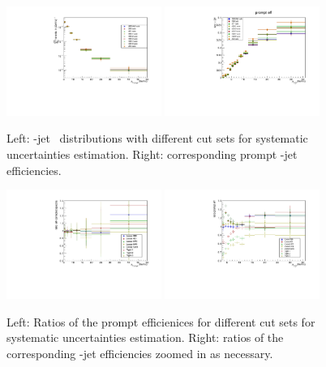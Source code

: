 \begin{figure}[bth]
\begin{center}
\includegraphics[width=0.45\textwidth]{pPbcuts_2sig/cutSys2/cutSys_spectra_D3}
\includegraphics[width=0.45\textwidth]{pPbcuts_2sig/cutSys2/cutSys_prompt}
\caption{Left: \Dzero-jet \pt\ distributions with different cut sets for systematic uncertainties estimation. Right: corresponding prompt \Dzero-jet efficiencies.} 
\label{fig:JetPtRawSys_Dzero}
\end{center}
\end{figure}

\begin{figure}[bth]
\begin{center}
\includegraphics[width=0.45\textwidth]{cutsys/cutSys_spectra_fixSig}
\includegraphics[width=0.45\textwidth]{cutsys/cutSys_prompt_fixSig}
\caption{Left: Ratios of the prompt efficienices for different cut sets for systematic uncertainties estimation. Right: ratios of the corresponding \Dzero-jet efficiencies zoomed in as necessary.} 
\label{fig:JetPtRawSysRatio_Dzero}
\end{center}
\end{figure}

